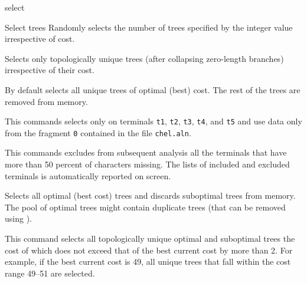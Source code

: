 \begin{command}{select}{}
\begin{arguments}
\begin{argumentgroup}{Select trees}
	{Randomly selects the number of trees specified by the integer
	value irrespective of cost.} 
                {}

	{Selects only topologically unique trees (after collapsing zero-length
	branches) irrespective of their cost.} 
                {}

		\end{argumentgroup}
	
	\end{arguments}
	 	 	 	 	  
        {By default \poy selects all unique trees of optimal (best) cost. The rest of
        the trees are removed from memory.}

	\begin{poyexamples}
        
        
            {This commands selects only on terminals \texttt{t1},  \texttt{t2},
             \texttt{t3},  \texttt{t4}, and  \texttt{t5} and use data only from the
              fragment  \texttt{0} contained in the file \texttt{chel.aln}.}
	
	{This commands excludes from subsequent analysis all the terminals that
	have more than 50 percent of characters missing. The lists of included and excluded
	terminals is automatically reported on screen.}
	
            {Selects all optimal (best cost) trees and discards suboptimal trees from
            memory. The pool of optimal trees might contain duplicate trees (that can
            be removed using ).}
            
	{This command selects all topologically unique optimal and suboptimal trees
	the cost of which does not exceed that of the best current cost by more than
	2. For example, if the best current cost is 49, all unique trees that fall within
	the cost range 49--51 are selected.}
	
	\end{poyexamples}

	\begin{poyalso}
	\end{poyalso}

\end{command}

